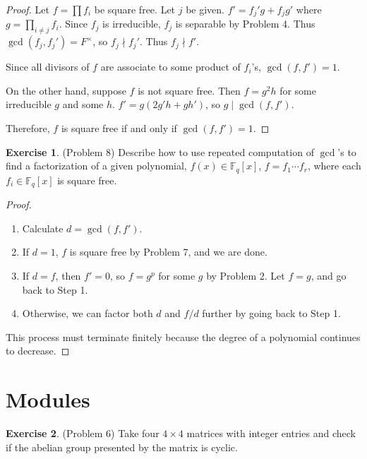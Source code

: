 \documentclass[12pt, psamsfonts]{amsart}
\theoremstyle{definition}
\newtheorem*{exer}{Exercise}
\theoremstyle{remark}
\numberwithin{equation}{section}
\begin{document}
\begin{proof}
  Let $f = \prod f_i$ be square free.
  Let $j$ be given.
  $f' = f_j'g + f_jg'$ where $g = \prod_{i \ne j} f_i$.
  Since $f_j$ is irreducible, $f_j$ is separable by Problem 4.
  Thus $\gcd(f_j, f_j') = F^{\times}$, so $f_j \nmid f_j'$.
  Thus $f_j \nmid f'$.

  Since all divisors of $f$ are associate to some product of $f_i$'s, $\gcd(f, f') = 1$.

  On the other hand, suppose $f$ is not square free.
  Then $f = g^2h$ for some irreducible $g$ and some $h$.
  $f' = g(2g'h + gh')$, so $g \mid \gcd(f, f')$.

  Therefore, $f$ is square free if and only if $\gcd(f, f') = 1$.
\end{proof}

\begin{exer}{(Problem 8)}
  Describe how to use repeated computation of $\gcd$'s to find a factorization of a given polynomial, $f(x) \in \mathbb{F}_q[x]$, $f = f_1 \cdots f_r$, where each $f_i \in \mathbb{F}_q[x]$ is square free.
\end{exer}

\begin{proof}
  $ $
  \begin{enumerate}
    \item
      Calculate $d = \gcd(f, f')$.
    \item
      If $d = 1$, $f$ is square free by Problem 7, and we are done.
    \item
      If $d = f$, then $f' = 0$, so $f = g^p$ for some $g$ by Problem 2.
      Let $f = g$, and go back to Step 1.
    \item
      Otherwise, we can factor both $d$ and $f / d$ further by going back to Step 1.
  \end{enumerate}
  This process must terminate finitely because the degree of a polynomial continues to decrease.
\end{proof}

\section{Modules}

\begin{exer}{(Problem 6)}
  Take four $4 \times 4$ matrices with integer entries and check if the abelian group presented by the matrix is cyclic.
\end{exer}
\end{document}
